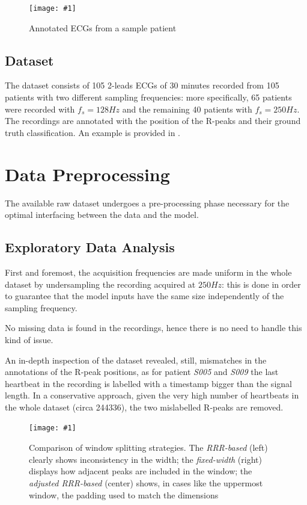 \documentclass[conference]{IEEEtran}
\newcommand{\addfigure}[3]{
    \begin{figure}
        \texttt{[image: \#1]}
        \caption{#2}
        \label{#3}
    \end{figure}
}
\begin{document}
    \addfigure
        {img/example.jpg} {Annotated ECGs from a sample patient}
        {fig:examples}

\subsection{Dataset}
    The dataset consists of 105 2-leads ECGs of 30 minutes recorded
    from 105 patients with two different sampling frequencies: more
    specifically, 65 patients were recorded with $f_s = 128 Hz$ and
    the remaining 40 patients with $f_s = 250Hz$. The recordings are
    annotated with the position of the R-peaks and their ground truth
    classification. An example is provided in .

\section{Data Preprocessing}
    The available raw dataset undergoes a pre-processing phase
    necessary for the optimal interfacing between the data and the
    model. 

\subsection{Exploratory Data Analysis}
    First and foremost, the acquisition frequencies are made uniform
    in the whole dataset by undersampling the recording acquired at
    $250Hz$: this is done in order to guarantee that the model inputs
    have the same size independently of the sampling frequency.  

    No missing data is found in the recordings, hence there is no need
    to handle this kind of issue.
    

    An in-depth inspection of the dataset revealed, still, mismatches
    in the annotations of the R-peak positions, as for patient
    \textit{S005} and \textit{S009} the last heartbeat in the
    recording is labelled with a timestamp bigger than the signal
    length. In a conservative approach, given the very high number of
    heartbeats in the whole dataset (circa 244336), the two
    mislabelled R-peaks are removed.

    \addfigure
        {img/windowing.jpg} {Comparison of window splitting
        strategies. The \textit{RRR-based} (left) clearly shows
        inconsistency in the width; the \textit{fixed-width} (right)
        displays how adjacent peaks are included in the window; the
        \textit{adjusted RRR-based} (center) shows, in cases like the
        uppermost window, the padding used to match the dimensions}
        {fig:windowing}
\end{document}
